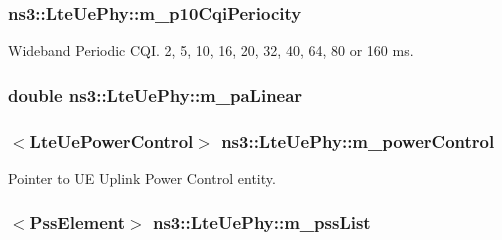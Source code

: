 \subsubsection[{\texorpdfstring{m\+\_\+p10\+Cqi\+Periocity}{m_p10CqiPeriocity}}]{ ns3\+::\+Lte\+Ue\+Phy\+::m\+\_\+p10\+Cqi\+Periocity\hspace{0.3cm}{\ttfamily [private]}}\hypertarget{classns3_1_1LteUePhy_a43fdf08302e7659a495f320c95974c93}{}\label{classns3_1_1LteUePhy_a43fdf08302e7659a495f320c95974c93}


Wideband Periodic C\+QI. 2, 5, 10, 16, 20, 32, 40, 64, 80 or 160 ms. 

\subsubsection[{\texorpdfstring{m\+\_\+pa\+Linear}{m_paLinear}}]{\setlength{\rightskip}{0pt plus 5cm}double ns3\+::\+Lte\+Ue\+Phy\+::m\+\_\+pa\+Linear\hspace{0.3cm}{\ttfamily [private]}}\hypertarget{classns3_1_1LteUePhy_ac0fbcaa87d4b06827890924c0189d9e6}{}\label{classns3_1_1LteUePhy_ac0fbcaa87d4b06827890924c0189d9e6}
\subsubsection[{\texorpdfstring{m\+\_\+power\+Control}{m_powerControl}}]{$<${\bf Lte\+Ue\+Power\+Control}$>$ ns3\+::\+Lte\+Ue\+Phy\+::m\+\_\+power\+Control\hspace{0.3cm}{\ttfamily [private]}}\hypertarget{classns3_1_1LteUePhy_a60d8441e8e06f624019df3ab9c9c6dec}{}\label{classns3_1_1LteUePhy_a60d8441e8e06f624019df3ab9c9c6dec}


Pointer to UE Uplink Power Control entity. 

\subsubsection[{\texorpdfstring{m\+\_\+pss\+List}{m_pssList}}]{$<${\bf Pss\+Element}$>$ ns3\+::\+Lte\+Ue\+Phy\+::m\+\_\+pss\+List\hspace{0.3cm}{\ttfamily [private]}}\hypertarget{classns3_1_1LteUePhy_a65bf8a30d9bdcfbe5f8e2faac4007406}{}\label{classns3_1_1LteUePhy_a65bf8a30d9bdcfbe5f8e2faac4007406}
